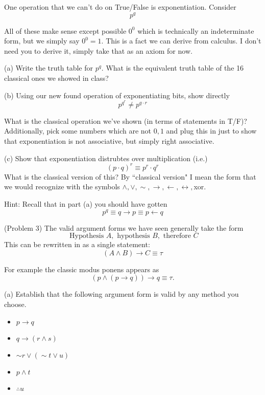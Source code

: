 \documentclass[16 pt]{amsart}
\theoremstyle{definition}
\theoremstyle{remark}
\numberwithin{equation}{subsection}
\begin{document}
One operation that we can't do on True/False is exponentiation.  Consider
\[
p^q
\]

All of these make sense except possible $0^0$ which is technically an indeterminate form, but we simply say $0^0 = 1$.  This is a fact we can derive from calculus.  I don't need you to derive it, simply take that as an axiom for now.\\

\vspace{.25in}

(a) Write the truth table for $p^q$.  What is the equivalent truth table of the 16 classical ones we showed in class?

\vspace{.25in}

(b) Using our new found operation of exponentiating bits, show directly
\[
p^{q^r} \neq p^{q\cdot r}
\]

What is the classical operation we've shown (in terms of statements in T/F)?  Additionally, pick some numbers which are not $0,1$ and plug this in just to show that exponentiation is not associative, but simply right associative.  

\vspace{.25in}

(c) Show that exponentiation distrubtes over multiplication (i.e.)
\[
(p\cdot q)^r \equiv p^r \cdot q^r
\]
What is the classical version of this? By ``classical version" I mean the form that we would recognize with the symbols $\wedge,\vee,\sim,\rightarrow,\leftarrow, \leftrightarrow,$xor.  

Hint: Recall that in part (a) you should have gotten
\[
p^q \equiv q\rightarrow p \equiv p \leftarrow q
\]

\newpage


(Problem 3) The valid argument forms we have seen generally take the form
\[
\text{ Hypothesis } A, \text{ hypothesis } B, \text{ therefore } C
\]
This can be rewritten in as a single statement:
\[
(A\wedge B) \rightarrow C \equiv \tau
\]

For example the classic modus ponens appears as
\[
(p \wedge(p\rightarrow q)) \rightarrow q \equiv \tau.
\]

(a) Establish that the following argument form is valid by any method you choose.
\begin{itemize}
\item[] $p\rightarrow q$\\
\item[] $q \rightarrow (r \wedge s)$\\
\item[] $\sim r \vee (\sim t \vee u)$\\
\item[] $p\wedge t$\\
\item[] $\therefore u$
\end{itemize}
 
\end{document}
